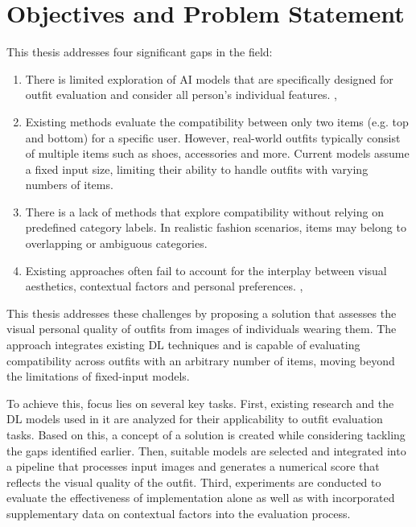 \section{Objectives and Problem Statement}

This thesis addresses four significant gaps in the field:

\begin{enumerate}
\item There is limited exploration of \acs{AI} models that are specifically designed for outfit evaluation and consider all person's individual features. \cite[vgl.]{chen_survey_2023}, \cite[vgl.]{deldjoo_review_2022}
\item Existing methods evaluate the compatibility between only two items (e.g. top and bottom) for a specific user. However, real-world outfits typically consist of multiple items such as shoes, accessories and more. Current models assume a fixed input size, limiting their ability to handle outfits with varying numbers of items. \cite[vgl.]{chen_survey_2023}
\item There is a lack of methods that explore compatibility without relying on predefined category labels. In realistic fashion scenarios, items may belong to overlapping or ambiguous categories. \cite[vgl.]{chen_survey_2023}
\item Existing approaches often fail to account for the interplay between visual aesthetics, contextual factors and personal preferences. \cite[vgl.]{chen_survey_2023}, \cite[vgl.]{deldjoo_review_2022}
\end{enumerate}

This thesis addresses these challenges by proposing a solution that assesses the visual personal quality of outfits from images of individuals wearing them. The approach integrates existing \acs{DL} techniques and is capable of evaluating compatibility across outfits with an arbitrary number of items, moving beyond the limitations of fixed-input models.

To achieve this, focus lies on several key tasks. First, existing research and the \acs{DL} models used in it are analyzed for their applicability to outfit evaluation tasks. Based on this, a concept of a solution is created while considering tackling the gaps identified earlier. Then, suitable models are selected and integrated into a pipeline that processes input images and generates a numerical score that reflects the visual quality of the outfit. Third, experiments are conducted to evaluate the effectiveness of implementation alone as well as with incorporated supplementary data on contextual factors into the evaluation process.

